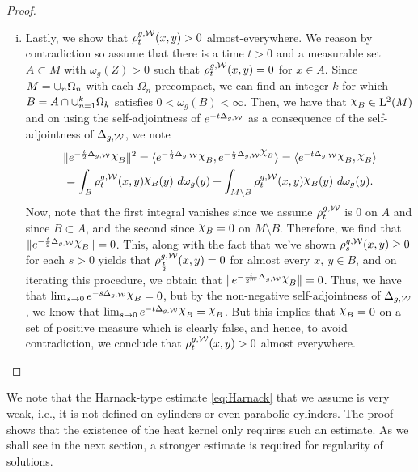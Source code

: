 \documentclass[a4paper, 12pt]{amsart}
\begin{document}
\begin{proof}
\begin{enumerate}[(i)]
\item Lastly, we show that $\rho^{g,\mathcal{W}}_t(x,y) > 0$  almost-everywhere.
	We reason by contradiction so assume that there
	is a time $t > 0$ and a measurable set $A \subset M$ with $\omega_g(Z) > 0$
	such that $\rho^{g,\mathcal{W}}_t(x,y) = 0$ for $x \in A$.
	Since $M = \cup_{n} \Omega_n$ with each 
	$\Omega_n$ precompact, we can find an integer
	$k$ for which $B = A \cap \cup_{n=1}^k \Omega_k$ 
	satisfies $0 < \omega_g(B) < \infty$. Then,
	we have that $\ind{B} \in \Lp{2}(M)$ and 
	on using the self-adjointness of $e^{-t\Delta_{g,\mathcal{W}}}$ as a consequence 
	of the self-adjointness of $\Delta_{g,\mathcal{W}}$,
	we note
	\begin{multline*}  
	\norm{e^{-\frac{t}{2} \Delta_{g,\cW}}\ind{B}}^2 
		 = \inprod{e^{-\frac{t}{2} \Delta_{g,\cW}} \ind{B}, e^{-{\frac{t}{2}}\Delta_{g,\cW} \ind{B}}}
		 = \inprod{e^{-t \Delta_{g,\cW}} \ind{B},\ind{B}} \\
		= \int_{B} \hk^{g,\cW}_t(x,y)\ind{B}(y)\ d\omega_g(y) + 
			\int_{M \setminus B} \hk^{g,\cW}_t(x,y)\ind{B}(y)\ d\omega_g(y).
	\end{multline*}
	Now, note that the first integral vanishes
	since we assume $\rho^{g,\mathcal{W}}_t$ is $0$ on $A$ and since $B \subset A$, 
	and the second since $\ind{B} = 0$ on $M \setminus B$.
	Therefore, we find that $\norm{e^{-\frac{t}{2} \Delta_{g,\cW}} \ind{B}} = 0$.
	This, along with the fact that we've shown $\rho^{g,\mathcal{W}}_s(x,y) \geq 0$ 
	for each $s > 0$ yields that $\rho^{g,\mathcal{W}}_{\frac{t}{2}}(x,y) = 0$ for 
	almost every $x,\ y \in B$, and on 
	iterating this procedure, we obtain that
	$\norm{e^{-\frac{t}{2^m} \Delta_{g,\cW}} \ind{B}} = 0$.
	Thus, we have that $\lim_{s\to 0} e^{-s \Delta_{g,\cW}} \ind{B} = 0$, 
	but by the non-negative self-adjointness of
	$\Delta_{g,\mathcal{W}}$, we know that $\lim_{s \to 0} e^{-t \Delta_{g,\cW}} \ind{B} = \ind{B}$.
	But this implies that $\ind{B} = 0$ on a set of positive measure which is clearly false, 
	and hence, to avoid contradiction, we conclude that $\rho^{g,\mathcal{W}}_t(x,y) > 0$ almost everywhere.
	\qedhere
\end{enumerate} 
\end{proof}

\begin{rem}
We note that the Harnack-type estimate \eqref{eq:Harnack} that we assume is very 
weak, i.e., it is not defined on cylinders or even 
parabolic cylinders. The proof shows that the existence 
of the heat kernel only requires such an estimate. 
As we shall see in the next section, a stronger
estimate is required for regularity of solutions. 
\end{rem}
\end{document}
